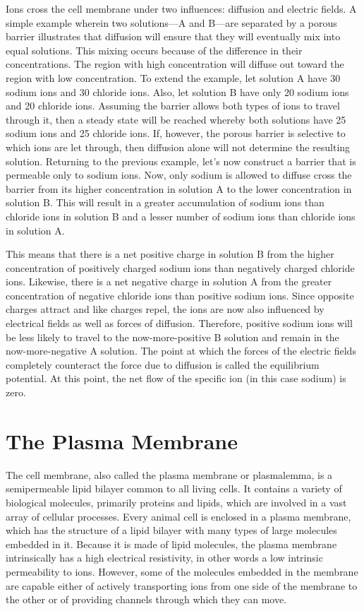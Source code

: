 Ions cross the cell membrane under two influences: diffusion and electric fields. A simple example wherein two solutions---A and B---are separated by a porous barrier illustrates that diffusion will ensure that they will eventually mix into equal solutions. This mixing occurs because of the difference in their concentrations. The region with high concentration will diffuse out toward the region with low concentration. To extend the example, let solution A have 30 sodium ions and 30 chloride ions. Also, let solution B have only 20 sodium ions and 20 chloride ions. Assuming the barrier allows both types of ions to travel through it, then a steady state will be reached whereby both solutions have 25 sodium ions and 25 chloride ions. If, however, the porous barrier is selective to which ions are let through, then diffusion alone will not determine the resulting solution. Returning to the previous example, let's now construct a barrier that is permeable only to sodium ions. Now, only sodium is allowed to diffuse cross the barrier from its higher concentration in solution A to the lower concentration in solution B. This will result in a greater accumulation of sodium ions than chloride ions in solution B and a lesser number of sodium ions than chloride ions in solution A.

This means that there is a net positive charge in solution B from the higher concentration of positively charged sodium ions than negatively charged chloride ions. Likewise, there is a net negative charge in solution A from the greater concentration of negative chloride ions than positive sodium ions. Since opposite charges attract and like charges repel, the ions are now also influenced by electrical fields as well as forces of diffusion. Therefore, positive sodium ions will be less likely to travel to the now-more-positive B solution and remain in the now-more-negative A solution. The point at which the forces of the electric fields completely counteract the force due to diffusion is called the equilibrium potential. At this point, the net flow of the specific ion (in this case sodium) is zero.

\hypertarget{the-plasma-membrane}{%
\section{The Plasma Membrane}\label{the-plasma-membrane}}

The cell membrane, also called the plasma membrane or plasmalemma, is a semipermeable lipid bilayer common to all living cells. It contains a variety of biological molecules, primarily proteins and lipids, which are involved in a vast array of cellular processes.
Every animal cell is enclosed in a plasma membrane, which has the structure of a lipid bilayer with many types of large molecules embedded in it. Because it is made of lipid molecules, the plasma membrane intrinsically has a high electrical resistivity, in other words a low intrinsic permeability to ions. However, some of the molecules embedded in the membrane are capable either of actively transporting ions from one side of the membrane to the other or of providing channels through which they can move.

